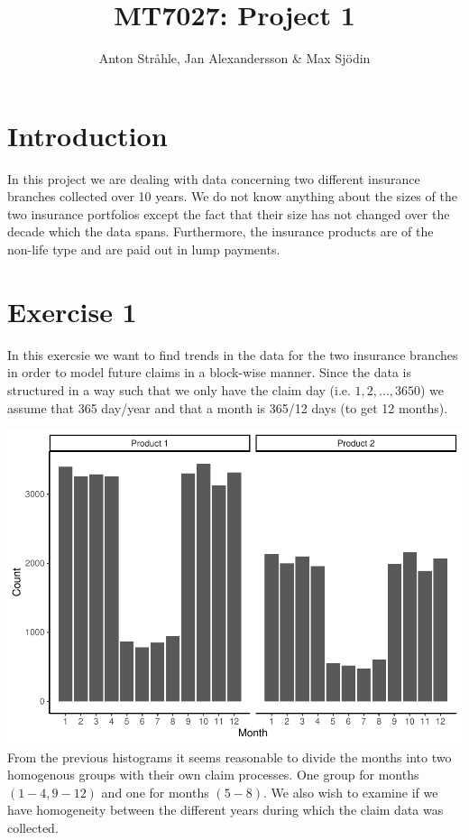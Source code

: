 \documentclass[]{article}
\title{MT7027: Project 1}
\author{Anton Stråhle, Jan Alexandersson \& Max Sjödin}
\date{}
\begin{document}
\maketitle

\section{Introduction}\label{introduction}

In this project we are dealing with data concerning two different
insurance branches collected over 10 years. We do not know anything
about the sizes of the two insurance portfolios except the fact that
their size has not changed over the decade which the data spans.
Furthermore, the insurance products are of the non-life type and are
paid out in lump payments.

\section{Exercise 1}\label{exercise-1}

In this exercsie we want to find trends in the data for the two
insurance branches in order to model future claims in a block-wise
manner. Since the data is structured in a way such that we only have the
claim day (i.e. \(1,2,...,3650\)) we assume that 365 day/year and that a
month is 365/12 days (to get 12 months).

\includegraphics{Projekt1_files/figure-latex/unnamed-chunk-2-1.pdf} From
the previous histograms it seems reasonable to divide the months into
two homogenous groups with their own claim processes. One group for
months \((1-4, 9-12)\) and one for months \((5-8)\). We also wish to
examine if we have homogeneity between the different years during which
the claim data was collected.
\end{document}
